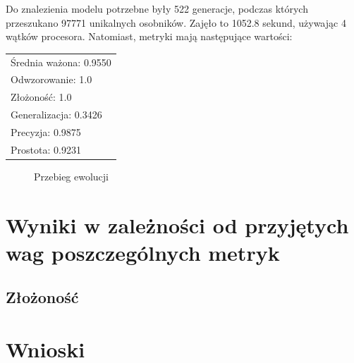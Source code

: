 Do znalezienia modelu potrzebne były 522 generacje, podczas których przeszukano 97771 unikalnych osobników. Zajęło to 1052.8 sekund, używając 4 wątków procesora. Natomiast, metryki mają następujące wartości: 

 \begin{center}
  \begin{tabular}{l}
	Średnia ważona: 0.9550 \\
	Odwzorowanie: 1.0 \\
	Złożoność: 1.0 \\
	Generalizacja: 0.3426 \\
	Precyzja: 0.9875 \\
	Prostota: 0.9231
  \end{tabular}
 \end{center}
 
\begin{figure}[!ht]
	\caption{\label{fig:flow_chart}Przebieg ewolucji}
\end{figure}


\section{Wyniki w zależności od przyjętych wag poszczególnych metryk}

\subsection{Złożoność}

\section{Wnioski}

